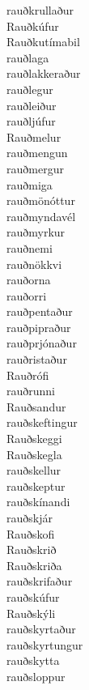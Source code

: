 \documentclass[../samsetningasafn.tex]{subfiles}
\begin{document}
\begin{bigwordlist}
\begin{footnotesize}
\begin{multicols}{4}
\begin{description}
		\item [rauðkrullaður]
		\item [Rauðkúfur]
		\item [Rauðkutímabil]
		\item [rauðlaga]
		\item [rauðlakkeraður]
		\item [rauðlegur]
		\item [rauðleiður]
		\item [rauðljúfur]
		\item [Rauðmelur]
		\item [rauðmengun]
		\item [rauðmergur]
		\item [rauðmiga]
		\item [rauðmönóttur]
		\item [rauðmyndavél]
		\item [rauðmyrkur]
		\item [rauðnemi]
		\item [rauðnökkvi]
		\item [rauðorna]
		\item [rauðorri]
		\item [rauðpentaður]
		\item [rauðpipraður]
		\item [rauðprjónaður]
		\item [rauðristaður]
		\item [Rauðrófi]
		\item [rauðrunni]
		\item [Rauðsandur]
		\item [rauðskeftingur]
		\item [Rauðskeggi]
		\item [Rauðskegla]
		\item [rauðskellur]
		\item [rauðskeptur]
		\item [rauðskínandi]
		\item [rauðskjár]
		\item [Rauðskofi]
		\item [Rauðskrið]
		\item [Rauðskriða]
		\item [rauðskrifaður]
		\item [rauðskúfur]
		\item [Rauðskýli]
		\item [rauðskyrtaður]
		\item [rauðskyrtungur]
		\item [rauðskytta]
		\item [rauðsloppur]

\end{description}
\end{multicols}
\end{footnotesize}
\end{bigwordlist}
\end{document}
